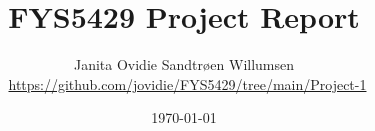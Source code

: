 \documentclass[reprint,english,notitlepage]{revtex4-1}  %
\begin{document}
% 


% 
\title{FYS5429 Project Report}
\author{Janita Ovidie Sandtrøen Willumsen \\ \faGithub \, \url{https://github.com/jovidie/FYS5429/tree/main/Project-1}}        
\date{\today}
\noaffiliation
\maketitle

\mainmatter         %






% 
 

% 

\end{document}
